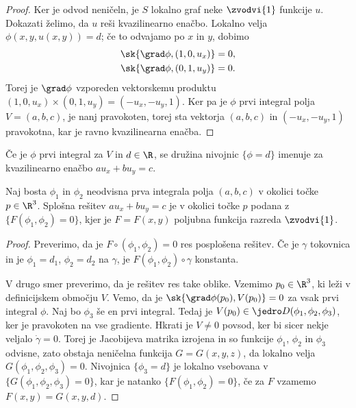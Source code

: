\begin{proof}
  Ker je odvod neničeln, je $S$ lokalno graf neke $\zvodvi{1}$ funkcije $u$.
  Dokazati želimo, da $u$ reši kvazilinearno enačbo.
  Lokalno velja $\phi(x,y,u(x,y)) = d$; če to odvajamo po $x$ in $y$, dobimo
  \begin{gather*}
	\sk{\grad \phi, (1, 0, u_x)} = 0, \\
	\sk{\grad \phi, (0, 1, u_y)} = 0.
  \end{gather*}
  Torej je $\grad \phi$ vzporeden vektorskemu produktu $(1,0,u_x) \times
  (0,1,u_y) = (-u_x, -u_y, 1)$.
  Ker pa je $\phi$ prvi integral polja $V = (a,b,c)$, je nanj pravokoten, torej
  sta vektorja $(a,b,c)$ in $(-u_x, -u_y, 1)$ pravokotna, kar je ravno
  kvazilinearna enačba.
\end{proof}


\begin{definicija}
  Če je $\phi$ prvi integral za $V$ in $d \in \R$, se družina nivojnic $\{\phi =
  d\}$ imenuje  za kvazilinearno enačbo $a u_x + b u_y =
  c$.
\end{definicija}

\begin{izrek}
  Naj bosta $\phi_1$ in $\phi_2$ neodvisna prva integrala polja $(a,b,c)$ v
  okolici točke $p \in \R^3$.
  Splošna rešitev $a u_x + b u_y = c$ je v okolici točke $p$ podana z
  $\{F(\phi_1, \phi_2) = 0\}$, kjer je $F = F(x,y)$ poljubna funkcija razreda
  $\zvodvi{1}$.
\end{izrek}

\begin{proof}
  Preverimo, da je $F \circ (\phi_1, \phi_2) = 0$ res posplošena rešitev.
  Če je $\gamma$ tokovnica in je $\phi_1 = d_1$, $\phi_2 = d_2$ na $\gamma$, je
  $F(\phi_1, \phi_2) \circ \gamma$ konstanta.

  V drugo smer preverimo, da je rešitev res take oblike.
  Vzemimo $p_0 \in \R^3$, ki leži v definicijskem območju $V$.
  Vemo, da je $\sk{\grad \phi(p_0), V(p_0)} = 0$ za vsak prvi integral $\phi$.
  Naj bo $\phi_3$ še en prvi integral.
  Tedaj je $V(p_0) \in \jedro D(\phi_1, \phi_2, \phi_3)$, ker je pravokoten na
  vse gradiente.
  Hkrati je $V \ne 0$ povsod, ker bi sicer nekje veljalo $\dot{\gamma} = 0$.
  Torej je Jacobijeva matrika izrojena in so funkcije $\phi_1$, $\phi_2$ in
  $\phi_3$ odvisne, zato obstaja neničelna funkcija $G = G(x,y,z)$, da lokalno
  velja $G(\phi_1, \phi_2, \phi_3) = 0$.
  Nivojnica $\{\phi_3 = d\}$ je lokalno vsebovana v $\{G(\phi_1, \phi_2,
  \phi_3) = 0\}$, kar je natanko $\{F(\phi_1, \phi_2) = 0\}$, če za $F$ vzamemo
  $F(x,y) = G(x,y,d)$.
\end{proof}

